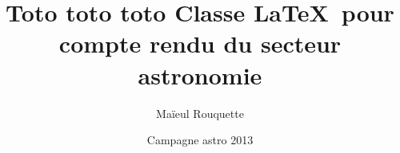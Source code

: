 \documentclass{plasci-secastro}
\date{Campagne astro 2013}
\author{Maïeul Rouquette}
\title{Toto toto toto Classe \LaTeX\ pour compte rendu du secteur astronomie}
\begin{document}
\maketitle
\lipsum
\lipsum
\lipsum
\end{document}
